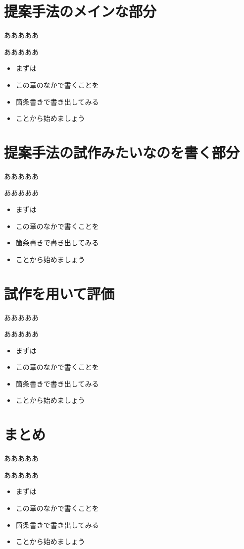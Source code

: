 \documentclass[a4j]{jarticle}
\begin{document}
\newpage
\section{提案手法のメインな部分}
あああああ

あああああ

\begin{itemize}
\item まずは
\item この章のなかで書くことを
\item 箇条書きで書き出してみる
\item ことから始めましょう
\end{itemize}


\newpage
\section{提案手法の試作みたいなのを書く部分}
あああああ

あああああ

\begin{itemize}
\item まずは
\item この章のなかで書くことを
\item 箇条書きで書き出してみる
\item ことから始めましょう
\end{itemize}

\newpage
\section{試作を用いて評価}
あああああ

あああああ

\begin{itemize}
\item まずは
\item この章のなかで書くことを
\item 箇条書きで書き出してみる
\item ことから始めましょう
\end{itemize}

\newpage
\section{まとめ}
あああああ

あああああ

\begin{itemize}
\item まずは
\item この章のなかで書くことを
\item 箇条書きで書き出してみる
\item ことから始めましょう
\end{itemize}
\end{document}
